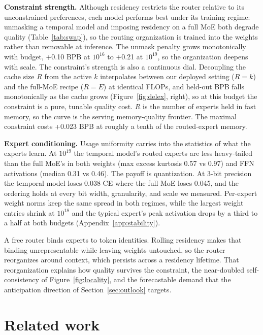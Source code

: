 \documentclass{article}
\begin{document}
\textbf{Constraint strength.} Although residency restricts the router relative to its
unconstrained preferences, each model performs best under its training regime: unmasking
a temporal model and imposing residency on a full MoE both degrade quality
(Table~\ref{tab:swap}), so the routing organization is trained into the weights rather than
removable at inference. The unmask penalty grows monotonically with budget, +0.10 BPB at
$10^{16}$ to +0.21 at $10^{19}$, so the organization deepens with scale. The constraint's strength is also a continuous dial.
Decoupling the cache size $R$ from the active $k$ interpolates between our deployed setting
($R = k$) and the full-MoE recipe ($R = E$) at identical FLOPs, and held-out BPB falls
monotonically as the cache grows (Figure~\ref{fig:delex}, right), so at this budget the
constraint is a pure, tunable quality cost. $R$ is the number of experts held in fast memory, so
the curve is the serving memory-quality frontier. The maximal constraint costs +0.023 BPB at
roughly a tenth of the routed-expert memory.

\textbf{Expert conditioning.} Usage uniformity carries into the statistics of what the experts
learn. At $10^{19}$ the temporal model's routed experts are less heavy-tailed than the full
MoE's in both weights (max excess kurtosis 0.57 vs 0.97) and FFN activations (median 0.31 vs
0.46). The payoff is quantization. At 3-bit precision the temporal model loses 0.038 CE where
the full MoE loses 0.045, and the ordering holds at every bit width, granularity, and scale we
measured. Per-expert weight norms keep the same spread in both regimes, while the largest
weight entries shrink at $10^{18}$ and the typical expert's peak activation drops by a third to
a half at both budgets (Appendix~\ref{app:stability}).

A free router binds experts to token identities. Rolling residency makes that binding
unrepresentable while leaving weights untouched, so the router reorganizes around context, which
persists across a residency lifetime. That reorganization explains how quality survives the
constraint, the near-doubled self-consistency of Figure~\ref{fig:locality}, and the forecastable
demand that the anticipation direction of Section~\ref{sec:outlook} targets.

\section{Related work}\label{sec:related}
\end{document}
